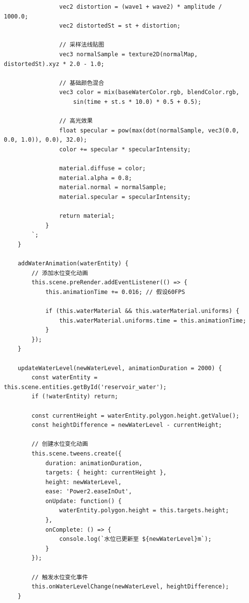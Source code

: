 \begin{lstlisting}
                vec2 distortion = (wave1 + wave2) * amplitude / 1000.0;
                vec2 distortedSt = st + distortion;
                
                // 采样法线贴图
                vec3 normalSample = texture2D(normalMap, distortedSt).xyz * 2.0 - 1.0;
                
                // 基础颜色混合
                vec3 color = mix(baseWaterColor.rgb, blendColor.rgb, 
                    sin(time + st.s * 10.0) * 0.5 + 0.5);
                
                // 高光效果
                float specular = pow(max(dot(normalSample, vec3(0.0, 0.0, 1.0)), 0.0), 32.0);
                color += specular * specularIntensity;
                
                material.diffuse = color;
                material.alpha = 0.8;
                material.normal = normalSample;
                material.specular = specularIntensity;
                
                return material;
            }
        `;
    }
    
    addWaterAnimation(waterEntity) {
        // 添加水位变化动画
        this.scene.preRender.addEventListener(() => {
            this.animationTime += 0.016; // 假设60FPS
            
            if (this.waterMaterial && this.waterMaterial.uniforms) {
                this.waterMaterial.uniforms.time = this.animationTime;
            }
        });
    }
    
    updateWaterLevel(newWaterLevel, animationDuration = 2000) {
        const waterEntity = this.scene.entities.getById('reservoir_water');
        if (!waterEntity) return;
        
        const currentHeight = waterEntity.polygon.height.getValue();
        const heightDifference = newWaterLevel - currentHeight;
        
        // 创建水位变化动画
        this.scene.tweens.create({
            duration: animationDuration,
            targets: { height: currentHeight },
            height: newWaterLevel,
            ease: 'Power2.easeInOut',
            onUpdate: function() {
                waterEntity.polygon.height = this.targets.height;
            },
            onComplete: () => {
                console.log(`水位已更新至 ${newWaterLevel}m`);
            }
        });
        
        // 触发水位变化事件
        this.onWaterLevelChange(newWaterLevel, heightDifference);
    }
    

\end{lstlisting}
